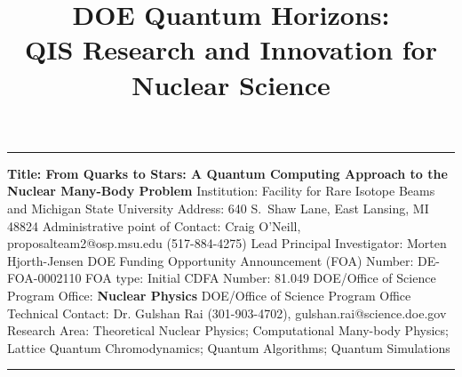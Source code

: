 \documentclass[10pt]{article}
\begin{document}
\title{DOE Quantum Horizons: \\ QIS Research and Innovation for Nuclear Science}
\maketitle
\rule{\linewidth}{1mm}
\begin{flushleft}
{\bf Title: From Quarks to Stars: A Quantum Computing Approach to the Nuclear Many-Body Problem}\newline
Institution: Facility for Rare Isotope Beams and Michigan State University\newline
Address: 640 S.~Shaw Lane, East Lansing, MI 48824\newline
Administrative point of Contact: Craig O'Neill, proposalteam2@osp.msu.edu (517-884-4275) \newline
Lead Principal Investigator: Morten Hjorth-Jensen\newline
DOE Funding Opportunity Announcement (FOA) Number: DE-FOA-0002110\newline
FOA type: Initial\newline
CDFA Number: 81.049\newline
DOE/Office of Science Program Office: {\bf Nuclear Physics}\newline
DOE/Office of Science Program Office Technical Contact: Dr. Gulshan Rai (301-903-4702), gulshan.rai@science.doe.gov\newline
Research Area: Theoretical Nuclear Physics; Computational Many-body Physics; Lattice Quantum Chromodynamics; Quantum Algorithms; Quantum Simulations
\end{flushleft}
\rule{\linewidth}{1mm}
\end{document}

